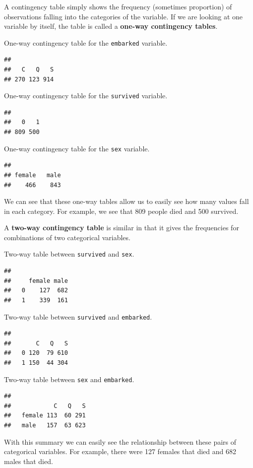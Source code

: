 \documentclass[
]{book}
\theoremstyle{definition}
\theoremstyle{definition}
\theoremstyle{definition}
\theoremstyle{remark}
\begin{document}
A contingency table simply shows the frequency (sometimes proportion) of observations falling into the categories of the variable. If we are looking at one variable by itself, the table is called a \textbf{one-way contingency tables}.

One-way contingency table for the \texttt{embarked} variable.

\begin{verbatim}
## 
##   C   Q   S 
## 270 123 914
\end{verbatim}

One-way contingency table for the \texttt{survived} variable.

\begin{verbatim}
## 
##   0   1 
## 809 500
\end{verbatim}

One-way contingency table for the \texttt{sex} variable.

\begin{verbatim}
## 
## female   male 
##    466    843
\end{verbatim}

We can see that these one-way tables allow us to easily see how many values fall in each category. For example, we see that 809 people died and 500 survived.

A \textbf{two-way contingency table} is similar in that it gives the frequencies for combinations of two categorical variables.

Two-way table between \texttt{survived} and \texttt{sex}.

\begin{verbatim}
##    
##     female male
##   0    127  682
##   1    339  161
\end{verbatim}

Two-way table between \texttt{survived} and \texttt{embarked}.

\begin{verbatim}
##    
##       C   Q   S
##   0 120  79 610
##   1 150  44 304
\end{verbatim}

Two-way table between \texttt{sex} and \texttt{embarked}.

\begin{verbatim}
##         
##            C   Q   S
##   female 113  60 291
##   male   157  63 623
\end{verbatim}

With this summary we can easily see the relationship between these pairs of categorical variables. For example, there were 127 females that died and 682 males that died.
\end{document}
